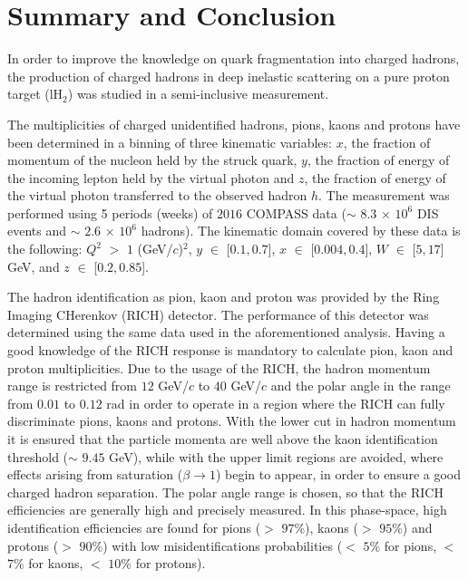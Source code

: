 
\chapter{Summary and Conclusion} %

\label{ch:CCL} %


In order to improve the knowledge on quark fragmentation into charged hadrons, the production of charged hadrons in deep inelastic scattering on a pure proton target (lH$_2$) was studied in a semi-inclusive measurement.

The multiplicities of charged unidentified hadrons, pions, kaons and protons have been determined in a binning of three kinematic variables: $x$, the fraction of momentum of the nucleon held by the struck quark, $y$, the fraction of energy of the incoming lepton held by the virtual photon and $z$, the fraction of energy of the virtual photon transferred to the observed hadron $h$. The measurement was performed using 5 periods (weeks) of $2016$ COMPASS data ($\sim$ $8.3$ $\times$ $10^6$ DIS events and $\sim$ $2.6$ $\times$ $10^6$ hadrons). The kinematic domain covered by these data is the following: $Q^2$ $>$ $1$ (GeV/$c$)$^2$, $y$ $\in$ [$0.1,0.7$], $x$ $\in$ [$0.004,0.4$], $W$ $\in$ [$5,17$] GeV, and $z$ $\in$ [$0.2,0.85$].

The hadron identification as pion, kaon and proton was provided by the Ring Imaging CHerenkov (RICH) detector. The performance of this detector was determined using the same data used in the aforementioned analysis. Having a good knowledge of the RICH response is mandatory to calculate pion, kaon and proton multiplicities. Due to the usage of the RICH, the hadron momentum range is restricted from $12$ GeV/$c$ to $40$ GeV/$c$ and the polar angle in the range from $0.01$ to $0.12$ rad in order to operate in a region where the RICH can fully discriminate pions, kaons and protons. With the lower cut in hadron momentum it is ensured that the particle momenta are well above the kaon identification threshold ($\sim$ $9.45$ GeV), while with the upper limit regions are avoided, where effects arising from saturation ($\beta \rightarrow 1$) begin to appear, in order to ensure a good charged hadron separation. The polar angle range is chosen, so that the RICH efficiencies are generally high and precisely measured. In this phase-space, high identification efficiencies are found for pions ($>$ $97$\%), kaons ($>$ $95$\%) and protons ($>$ $90$\%) with low misidentifications probabilities ($<$ $5$\% for pions, $<$ $7$\% for kaons, $<$ $10$\% for protons).

